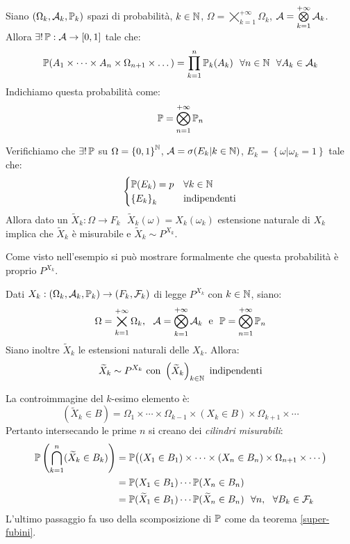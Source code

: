 \medskip
\begin{teo} \label{super-fubini}
  Siano $(\Omega_k, \mathcal A_k, \mathbb P_k)$ spazi di probabilità, $k \in \mathbb N$, $\Omega= \bigtimes\limits_{k=1}^{+\infty} \Omega_k$, $\mathcal A = \bigotimes\limits_{k=1}^{+\infty} \mathcal A_k $.\\
  Allora $\exists! \, \mathbb P: \mathcal A \to \left [0, 1 \right ]$ tale che:
  $$\mathbb P(A_1 \times \dots \times A_n \times \Omega_{n+1} \times \dots)
  = \prod_{k=1}^{n} \mathbb P_k(A_k) \ \ \forall n \in \mathbb N \ \ \forall A_k \in \mathcal A_k$$
  Indichiamo questa probabilità come:
  $$\mathbb P= \bigotimes\limits_{n=1}^{+\infty} \mathbb P_n$$
\end{teo}

\begin{ese}
  Verifichiamo che $\exists! \, \mathbb P$ su $ \Omega= \left \{0, 1 \right \} ^ {\mathbb N}$, $\mathcal A=\sigma(E_k | k \in \mathbb N)$, $E_k= \left \{ \omega | \omega_k=1 \right \}$ tale che:
  $$
    \begin{cases}
    \mathbb P(E_k)=p & \forall k \in \mathbb N \\
    \left \{ E_k \right \}_k & \text{indipendenti}
    \end{cases}
  $$
  Allora dato un $\widetilde{X}_k: \Omega \to F_k \ \ \ \widetilde{X}_k(\omega)=X_k(\omega_k) $ estensione naturale di $X_k$
  implica che $\widetilde{X}_k$ è misurabile e $\widetilde{X}_k \sim P^{X_k}$.
\end{ese}

\medskip
Come visto nell'esempio si può mostrare formalmente che questa probabilità è proprio $P^{X_k}$.
\begin{coro}
  Dati $X_k: (\Omega_k, \mathcal A_k, \mathbb P_k) \to (F_k, \mathcal F_k)$ di legge $P^{X_k}$ con $k \in \mathbb N$, siano:
  $$ \Omega=\bigtimes_{k=1}^{+\infty} \Omega_k, \ \ \Ac = \bigotimes\limits_{k=1}^{+\infty} \Ac_k \; \text{ e } \ \PP= \bigotimes\limits_{n=1}^{+\infty} \PP_n$$
  Siano inoltre $\widetilde{X}_k$ le estensioni naturali delle $X_k$. Allora:
  $$\widetilde{X}_k \sim P^{X_k} \text{ con } \left ( \widetilde{X}_k \right )_{k \in \mathbb N} \text{ indipendenti}$$
\end{coro}
\begin{dimo}
  La controimmagine del $k$-esimo elemento è:
  $$(\widetilde{X}_k \in B)= \Omega_1 \times \cdots \times \Omega_{k-1} \times (X_k \in B) \times \Omega_{k+1} \times \cdots$$
  Pertanto intersecando le prime $n$ si creano dei \textit{cilindri misurabili}:
  \begin{align*}
    \mathbb P\left(\bigcap_{k=1}^n (\widetilde{X}_k \in B_k)\right) 
    &= \mathbb P \big( (X_1 \in B_1) \times \cdots \times (X_n \in B_n) \times \Omega_{n+1} \times \cdots \big)\\
    &= \mathbb P(X_1 \in B_1)\cdots \mathbb P(X_n \in B_n)\\
    &= \mathbb P(\widetilde{X}_1 \in B_1) \cdots \mathbb P(\widetilde{X}_n \in B_n) \ \ \forall n, \ \ \forall B_k \in \mathcal F_k
  \end{align*}
  L'ultimo passaggio fa uso della scomposizione di $\mathbb P$ come da teorema \ref{super-fubini}. \qedhere
\end{dimo}

